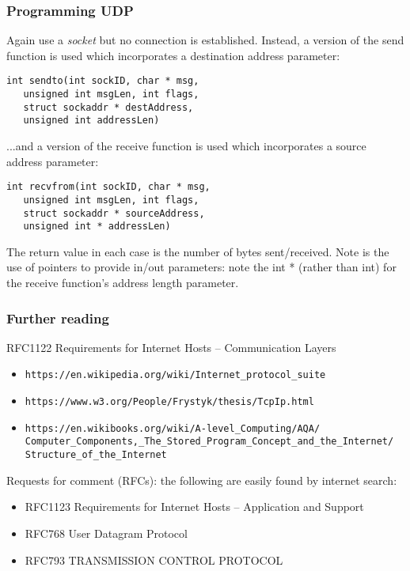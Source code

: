 \documentclass[10pt, hyperref={pdfpagelabels=false}]{beamer}
\begin{document}
\begin{frame} [fragile]
\frametitle{Programming UDP}
Again use a \emph{\color{blue}socket} but no connection is established. Instead,
a version of the send function is used which incorporates a destination address parameter:
{\color{blue}
\begin{verbatim}
int sendto(int sockID, char * msg,
   unsigned int msgLen, int flags,
   struct sockaddr * destAddress,
   unsigned int addressLen)
\end{verbatim}
}

...and a version of the receive function is used which incorporates a source address
parameter:
{\color{blue}
\begin{verbatim}
int recvfrom(int sockID, char * msg,
   unsigned int msgLen, int flags,
   struct sockaddr * sourceAddress,
   unsigned int * addressLen)
\end{verbatim}
}

The return value in each case is the number of bytes sent/received. Note is the use of pointers to provide in/out parameters: note the int * (rather than int) for the receive function's address length parameter.
\end{frame}

\begin{frame}
\frametitle{Further reading}
RFC1122 Requirements for Internet Hosts – Communication Layers
\begin{itemize}
\item \texttt{https://en.wikipedia.org/wiki/Internet\_protocol\_suite}
\item \texttt{https://www.w3.org/People/Frystyk/thesis/TcpIp.html}
\item \texttt{\small https://en.wikibooks.org/wiki/A-level\_Computing/AQA/\\Computer\_Components,\_The\_Stored\_Program\_Concept\_and\_the\_Internet/\\Structure\_of\_the\_Internet}
\end{itemize}

Requests for comment (RFCs): the following are easily found by internet search:
\begin{itemize}
\item RFC1123 Requirements for Internet Hosts – Application and Support
\item RFC768 User Datagram Protocol
\item RFC793 TRANSMISSION CONTROL PROTOCOL
\end{itemize}


\end{frame}
\end{document}
